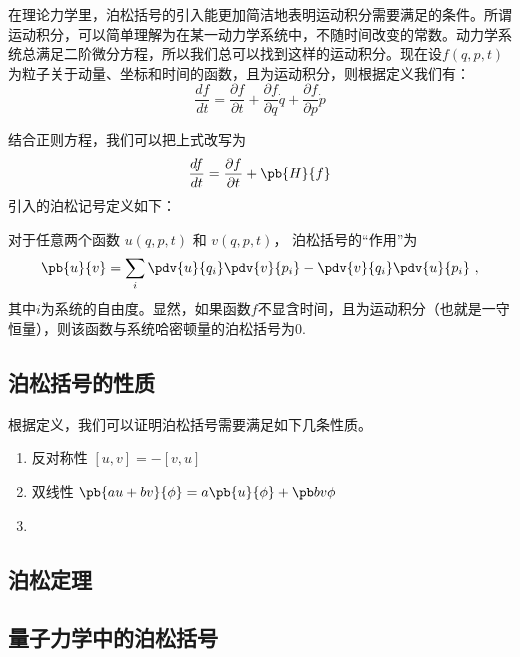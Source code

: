 
\begin{issues}
\issueDraft
\end{issues}

在理论力学里，泊松括号的引入能更加简洁地表明运动积分需要满足的条件。所谓运动积分，可以简单理解为在某一动力学系统中，不随时间改变的常数。动力学系统总满足二阶微分方程，所以我们总可以找到这样的运动积分。现在设$f(q,p,t)$为粒子关于动量、坐标和时间的函数，且为运动积分，则根据定义我们有：
\begin{equation}
\frac{df}{dt}=\frac{\partial f}{\partial t}+\frac{\partial f}{\partial q}\dot{q}+\frac{\partial f}{\partial p}\dot{ p}
\end{equation}

结合正则方程，我们可以把上式改写为
\begin{equation}
\frac{df}{dt}=\frac{\partial f}{\partial t}+\pb{H}{f}
\end{equation}
引入的泊松记号定义如下：


对于任意两个函数 $u(q, p, t)$ 和 $v(q, p, t)$， 泊松括号的“作用”为
\begin{equation}
\pb{u}{v} = \sum_i \pdv{u}{q_i}\pdv{v}{p_i} - \pdv{v}{q_i}\pdv{u}{p_i}~,
\end{equation}
其中$i$为系统的自由度。显然，如果函数$f$不显含时间，且为运动积分（也就是一守恒量），则该函数与系统哈密顿量的泊松括号为0.

\subsection{泊松括号的性质}
根据定义，我们可以证明泊松括号需要满足如下几条性质。
\begin{enumerate}
\item 反对称性
$[u,v]=-[v,u]$
\item 双线性
$\pb {au+bv}{\phi}=a\pb {u}{\phi}+\pb b{v}{\phi}$
\item 

\end{enumerate}
\subsection{泊松定理}
\subsection{量子力学中的泊松括号}


